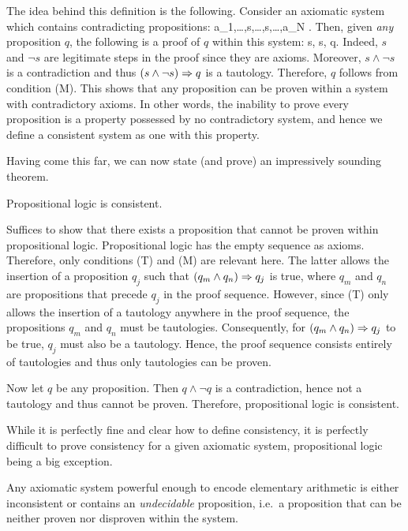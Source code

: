 The idea behind this definition is the following.
Consider an axiomatic system which contains contradicting propositions:
\bse
a_1,\ldots,s,\ldots,\neg s,\ldots,a_N .
\ese
Then, given \emph{any} proposition $q$, the following is a proof of $q$ within this system:
\bse
s, \neg s, q.
\ese
Indeed, $s$ and $\neg s$ are legitimate steps in the proof since they are axioms.
Moreover, $s\land \neg s$ is a contradiction and thus $(s\land \neg s) \Rightarrow q$ is a tautology.
Therefore, $q$ follows from condition (M).
This shows that any proposition can be proven within a system with contradictory axioms.
In other words, the inability to prove every proposition is a property possessed by no contradictory system, and hence we define a consistent system as one with this property.

Having come this far, we can now state (and prove) an impressively sounding theorem.

\bt
Propositional logic is consistent.
\et

\bq
Suffices to show that there exists a proposition that cannot be proven within propositional logic. Propositional logic has the empty sequence as axioms.
Therefore, only conditions (T) and (M) are relevant here.
The latter allows the insertion of a proposition $q_j$ such that $(q_m\land q_n) \Rightarrow q_j$ is true, where $q_m$ and $q_n$ are propositions that precede $q_j$ in the proof sequence.
However, since (T) only allows the insertion of a tautology anywhere in the proof sequence, the propositions $q_m$ and $q_n$ must be tautologies.
Consequently, for $(q_m\land q_n) \Rightarrow q_j$ to be true, $q_j$ must also be a tautology.
Hence, the proof sequence consists entirely of tautologies and thus only tautologies can be proven.

Now let $q$ be any proposition.
Then $q\land \neg q$ is a contradiction, hence not a tautology and thus cannot be proven.
Therefore, propositional logic is consistent.
\eq

\br
While it is perfectly fine and clear how to define consistency, it is perfectly difficult to prove consistency for a given axiomatic system, propositional logic being a big exception.
\er

\bt
Any axiomatic system powerful enough to encode elementary arithmetic is either inconsistent or contains an \emph{undecidable} proposition, i.e.\ a proposition that can be neither proven nor disproven within the system.
\et






















